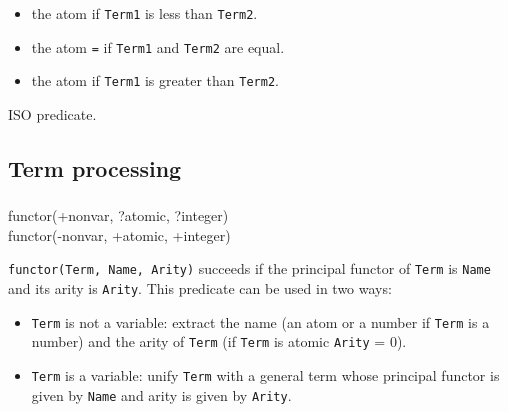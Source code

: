 \begin{itemize}

\item the atom \texttt{{\lt}} if \texttt{Term1} is less than \texttt{Term2}.

\item the atom \texttt{=} if \texttt{Term1} and \texttt{Term2} are equal.

\item the atom \texttt{{\gt}} if \texttt{Term1} is greater than
\texttt{Term2}.

\end{itemize}

\begin{PlErrors}



\end{PlErrors}

\Portability

ISO predicate.

\subsection{Term processing}

\subsubsection{ \label{functor/3}}

\begin{TemplatesOneCol}
functor(+nonvar, ?atomic, ?integer)\\
functor(-nonvar, +atomic, +integer)

\end{TemplatesOneCol}

\Description

\texttt{functor(Term, Name, Arity)} succeeds if the principal functor of
\texttt{Term} is \texttt{Name} and its arity is \texttt{Arity}. This
predicate can be used in two ways:

\begin{itemize}

\item \texttt{Term} is not a variable: extract the name (an atom or a number
if \texttt{Term} is a number) and the arity of \texttt{Term} (if
\texttt{Term} is atomic \texttt{Arity} = 0).

\item \texttt{Term} is a variable: unify \texttt{Term} with a general term
whose principal functor is given by \texttt{Name} and arity is given by
\texttt{Arity}.

\end{itemize}

